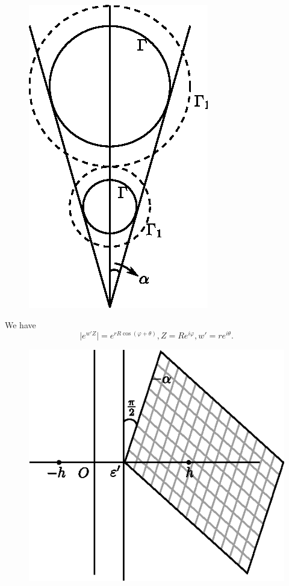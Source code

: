 \begin{figure}[H]
 \centerline{\includegraphics{vol15-figures/fig15-18.eps}}
\end{figure}

We have
$$
\big | e^{w' Z} \big | = e^{r R \cos (\varphi + \theta)}, Z = R e^{i
 \varphi}, w' = r e^{i \theta}. 
$$
\begin{figure}[H]
 \centerline{\includegraphics{vol15-figures/fig15-19.eps}}
\end{figure}

